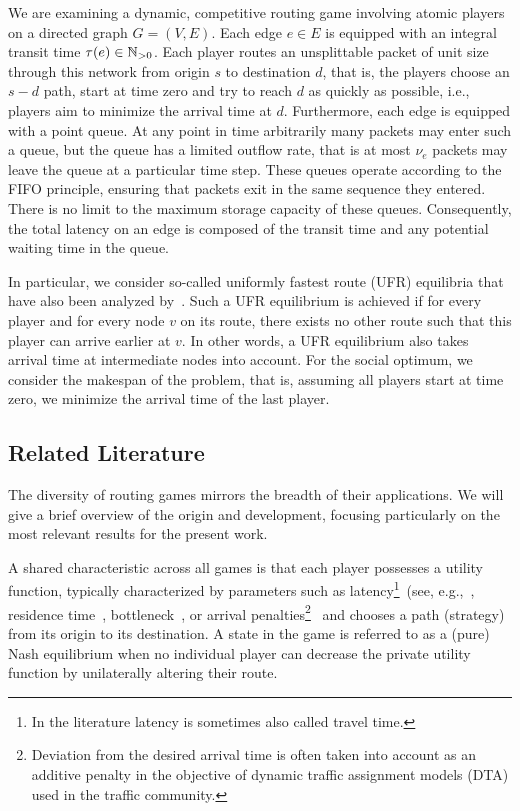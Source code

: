 We are examining a dynamic, competitive routing game involving atomic players on a directed graph $G=(V,E)$. Each edge $e \in E$ is equipped with an integral transit time $\tau(e) \in \mathbb{N}_{>0}$. Each player routes an unsplittable packet of unit size through this network from origin $s$ to destination $d$, that is, the players choose an $s-d$ path, start at time zero and try to reach $d$ as quickly as possible, i.e., players aim to minimize the arrival time at $d$. Furthermore, each edge is equipped with a point queue. At any point in time arbitrarily many packets may enter such a queue, but the queue has a limited outflow rate, that is at most $\nu_e$ packets may leave the queue at a particular time step. These queues operate according to the FIFO principle, ensuring that packets exit in the same sequence they entered. There is no limit to the maximum storage capacity of these queues. Consequently, the total latency on an edge is composed of the transit time and any potential waiting time in the queue.

In particular, we consider so-called uniformly fastest route (UFR) equilibria that have also been analyzed by~\cite{DBLP:journals/ior/ScarsiniST18}. Such a UFR equilibrium is achieved if for every player and for every node $v$ on its route, there exists no other route such that this player can arrive earlier at $v$. In other words, a UFR equilibrium also takes arrival time at intermediate nodes into account.
For the social optimum, we consider the makespan of the problem, that is, assuming all players start at time zero, we minimize the arrival time of the last player.

\subsection{Related Literature}

The diversity of routing games mirrors the breadth of their applications. We will give a brief overview of the origin and development, focusing particularly on the most relevant results for the present work.

A shared characteristic across all games is that each player possesses a utility function, typically characterized by parameters such as latency\footnote{In the literature latency is sometimes also called travel time.}~(see, e.g.,~\cite{braess1968paradoxon,kochskutella2011,pigou,DBLP:journals/ior/ScarsiniST18}, residence time~\cite{cao2022bounding}, bottleneck~\cite{WERTH201418}, or arrival penalties\footnote{ Deviation from the desired arrival time is often taken into account as an additive penalty in the objective of dynamic traffic assignment models (DTA) used in the traffic community.}~\cite{HAN201317} and chooses a path (strategy) from its origin to its destination. A state in the game is referred to as a (pure) Nash equilibrium when no individual player can decrease the private utility function by unilaterally altering their route.

